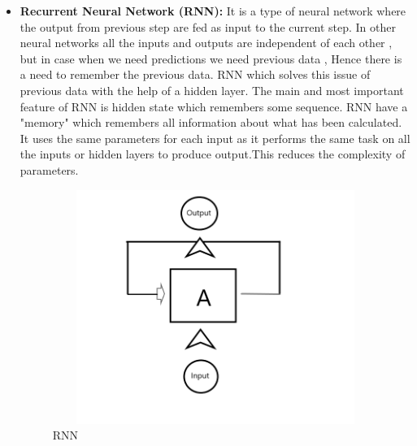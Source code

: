 \documentclass[openany,12pt]{report}
\begin{document}
\begin{itemize}
\item{\textbf{Recurrent Neural Network (RNN):}}
It is a type of neural network where the output from previous step are fed as input to the current step.
In other neural networks all the inputs and outputs are independent of each other , but in case when we need predictions we need previous data , Hence there is a need to remember the previous data.
RNN which solves this issue of previous data with the help of a hidden layer. The main and most important feature of RNN is hidden state which remembers some sequence.
RNN have a "memory" which remembers all information about what has been calculated.
It uses the same parameters for each input as it performs the same task on all the inputs or hidden layers to produce output.This reduces the complexity of parameters.

\begin{figure}[H]
\centering
\includegraphics[width=5in,height=3in]{./RNN.png}
\caption{RNN}
\end{figure}


\end{itemize}
\end{document}
